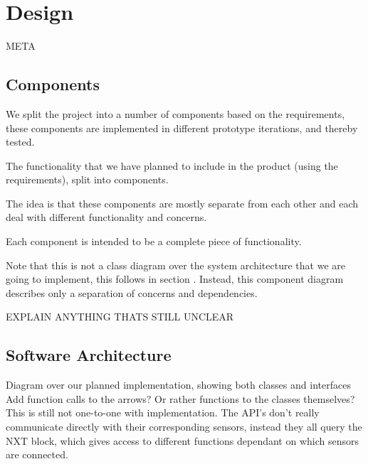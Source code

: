 \chapter{Design}
META

\section{Components}

We split the project into a number of components based on the requirements,  these components are implemented in different prototype iterations, and thereby tested. 



The functionality that we have planned to include in the product (using the requirements), split into components. 

The idea is that these components are mostly separate from each other and each deal with different functionality and concerns. 

Each component is intended to be a complete piece of functionality.

Note that this is not a class diagram over the system architecture that we are going to implement, this follows in section . Instead, this component diagram describes only a separation of concerns and dependencies.







EXPLAIN ANYTHING THATS STILL UNCLEAR



\section{Software Architecture}

Diagram over our planned implementation, showing both classes and interfaces
Add function calls to the arrows? Or rather functions to the classes themselves?
This is still not one-to-one with implementation. The API's don't really communicate directly with their corresponding sensors, instead they all query the NXT block, which gives access to different functions dependant on which sensors are connected.






%

